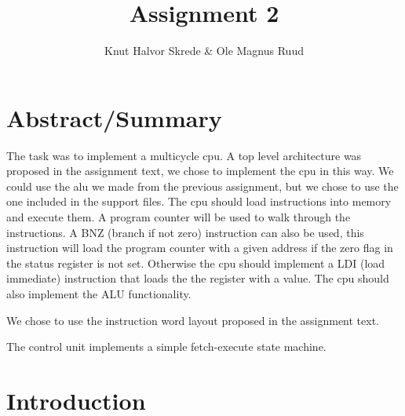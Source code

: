 \documentclass[11pt]{article}
\title{Assignment 2}
\author{Knut Halvor Skrede \& Ole Magnus Ruud}
\begin{document}
	\maketitle
	\clearpage


	\section*{Abstract/Summary}


	The task was to implement a multicycle cpu. A top level architecture was proposed in the assignment text, we chose to implement the cpu in this way. We could use the alu we made from the previous assignment, but we chose to use the one included in the support files. The cpu should load instructions into memory and execute them. A program counter will be used to walk through the instructions. A BNZ (branch if not zero) instruction can also be used, this instruction will load the program counter with a given address if the zero flag in the status register is not set. Otherwise the cpu should implement a LDI (load immediate) instruction that loads the the register with a value. The cpu should also implement the ALU functionality.

We chose to use the instruction word layout proposed in the assignment text.

The control unit implements a simple fetch-execute state machine.

	\section*{Introduction}

\end{document}
